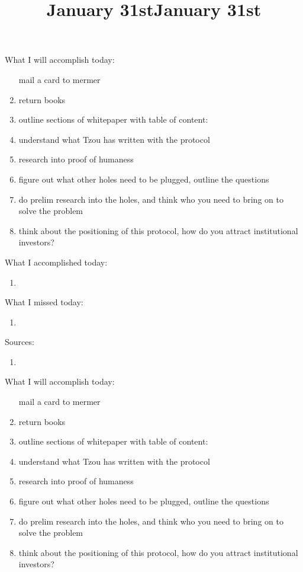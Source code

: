 \title{January 31st}

What I will accomplish today:

\begin{enumerate}
	\item [mail a card to mermer]
	\item return books
	\item outline sections of whitepaper with table of content: 
	\item understand what Tzou has written with the protocol
	\item research into proof of humaness
	\item figure out what other holes need to be plugged, outline the questions
	\item do prelim research into the holes, and think who you need to bring on to solve the problem
	\item think about the positioning of this protocol, how do you attract institutional investors?
\end{enumerate}

What I accomplished today:

	
\begin{enumerate}
	\item
\end{enumerate}


What I missed today: 

\begin{enumerate}
	\item 
\end{enumerate}

Sources:

\begin{enumerate}
	\item 
\end{enumerate}

\title{January 31st}

What I will accomplish today:

\begin{enumerate}
	\item [mail a card to mermer]
	\item return books
	\item outline sections of whitepaper with table of content: 
	\item understand what Tzou has written with the protocol
	\item research into proof of humaness
	\item figure out what other holes need to be plugged, outline the questions
	\item do prelim research into the holes, and think who you need to bring on to solve the problem
	\item think about the positioning of this protocol, how do you attract institutional investors?
\end{enumerate}

